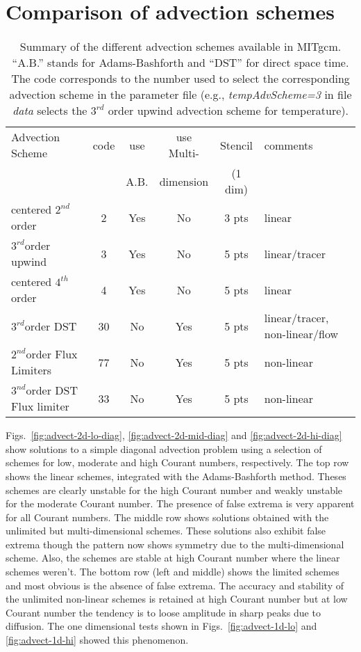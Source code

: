 \section{Comparison of advection schemes}

\begin{table}[htb]
\centering
 \begin{tabular}[htb]{|l|c|c|c|c|l|}
   \hline
   Advection Scheme & code & use  & use Multi- & Stencil & comments \\
                    &      & A.B. & dimension & (1 dim) & \\
   \hline \hline
   centered $2^{nd}$order & 2 &  Yes & No & 3 pts & linear \\
   \hline
   $3^{rd}$order upwind   & 3 &  Yes & No & 5 pts & linear/tracer\\
   \hline
   centered $4^{th}$order & 4 &  Yes & No & 5 pts & linear \\
   \hline \hline
   $3^{rd}$order DST & 30 &  No & Yes & 5 pts & linear/tracer, non-linear/flow\\
   \hline \hline
   $2^{nd}$order Flux Limiters & 77 &  No & Yes & 5 pts & non-linear \\
   \hline
   $3^{nd}$order DST Flux limiter & 33 &  No & Yes & 5 pts & non-linear \\
   \hline
 \end{tabular}
 \caption{Summary of the different advection schemes available in MITgcm.
          ``A.B.'' stands for Adams-Bashforth and ``DST'' for direct space time.
          The code corresponds to the number used to select the corresponding
          advection scheme in the parameter file (e.g., {\em tempAdvScheme=3} in
          file {\em data} selects the $3^{rd}$ order upwind advection scheme 
          for temperature).
   }
 \label{tab:advectionShemes_summary}
\end{table}


Figs.~\ref{fig:advect-2d-lo-diag}, \ref{fig:advect-2d-mid-diag} and
\ref{fig:advect-2d-hi-diag} show solutions to a simple diagonal
advection problem using a selection of schemes for low, moderate and
high Courant numbers, respectively. The top row shows the linear
schemes, integrated with the Adams-Bashforth method. Theses schemes
are clearly unstable for the high Courant number and weakly unstable
for the moderate Courant number. The presence of false extrema is very
apparent for all Courant numbers. The middle row shows solutions
obtained with the unlimited but multi-dimensional schemes. These
solutions also exhibit false extrema though the pattern now shows
symmetry due to the multi-dimensional scheme. Also, the schemes are
stable at high Courant number where the linear schemes weren't. The
bottom row (left and middle) shows the limited schemes and most
obvious is the absence of false extrema. The accuracy and stability of
the unlimited non-linear schemes is retained at high Courant number
but at low Courant number the tendency is to loose amplitude in sharp
peaks due to diffusion. The one dimensional tests shown in
Figs.~\ref{fig:advect-1d-lo} and \ref{fig:advect-1d-hi} showed this
phenomenon.

